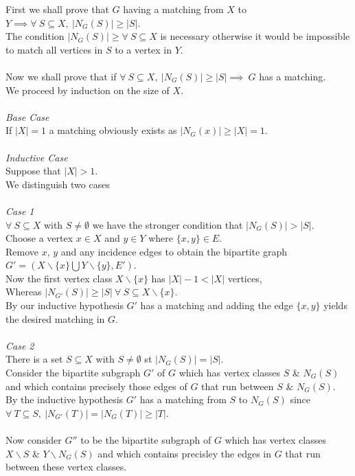 \documentclass[11pt,a4paper]{article}
\begin{document}
First we shall prove that $G$ having a matching from $X$ to $Y\implies\forall\ S\subseteq X,\ |N_G(S)|\geq|S|$.\\
The condition $|N_G(S)|\geq\forall\ S\subseteq X$ is necessary otherwise it would be impossible to match all vertices in $S$ to a vertex in $Y$.\\
\\
Now we shall prove that if $\forall\ S\subseteq X,\ |N_G(S)|\geq|S|\implies\ G$ has a matching.\\
We proceed by induction on the size of $X$.\\
\\
\textit{Base Case}\\
If $|X|=1$ a matching obviously exists as $|N_G(x)|\geq|X|=1$.\\
\\
\textit{Inductive Case}\\
Suppose that $|X|>1$.\\
We distinguish two cases\\
\\
\textit{Case 1}\\
$\forall\ S\subseteq X$ with $S\neq\emptyset$ we have the stronger condition that $|N_G(S)|>|S|$.\\
Choose a vertex $x\in X$ and $y\in Y$ where $\{x,y\}\in E$.\\
Remove $x$, $y$ and any incidence edges to obtain the bipartite graph $G'=(X\backslash\{x\}\bigcup Y\backslash\{y\},E')$.\\
Now the first vertex class $X\backslash\{x\}$ has $|X|-1<|X|$ vertices,\\
Whereas $|N_{G'}(S)|\geq|S|\ \forall\ S\subseteq X\backslash\{x\}$.\\
By our inductive hypothesis $G'$ has a matching and adding the edge $\{x,y\}$ yields the desired matching in $G$.\\
\\
\textit{Case 2}\\
There is a set $S\subseteq X$ with $S\neq\emptyset$ st $|N_G(S)|=|S|$.\\
Consider the bipartite subgraph $G'$ of $G$ which has vertex classes $S$ \& $N_G(S)$ and which contains precisely those edges of $G$ that run between $S$ \& $N_G(S)$.\\
By the inductive hypothesis $G'$ has a matching from $S$ to $N_G(S)$ since $\forall\ T\subseteq S,\ |N_{G'}(T)|=|N_G(T)|\geq|T|$.\\
\\
Now consider $G''$ to be the bipartite subgraph of $G$ which has vertex classes $X\backslash S$ \& $Y\backslash N_G(S)$ and which contains precisley the edges in $G$ that run between these vertex classes.\\
\end{document}
